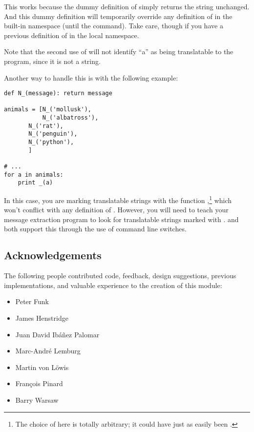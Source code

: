 This works because the dummy definition of \function{_()} simply returns
the string unchanged.  And this dummy definition will temporarily
override any definition of \function{_()} in the built-in namespace
(until the  command).
Take care, though if you have a previous definition of \function{_} in
the local namespace.

Note that the second use of \function{_()} will not identify ``a'' as
being translatable to the  program, since it is not
a string.

Another way to handle this is with the following example:

\begin{verbatim}
def N_(message): return message

animals = [N_('mollusk'),
           N_('albatross'),
	   N_('rat'),
	   N_('penguin'),
	   N_('python'),
	   ]

# ...
for a in animals:
    print _(a)
\end{verbatim}

In this case, you are marking translatable strings with the function
,\footnote{The choice of  here is totally
arbitrary; it could have just as easily been
.
} which won't conflict with any definition of
\function{_()}.  However, you will need to teach your message extraction
program to look for translatable strings marked with .
 and  both support this through the
use of command line switches.

\subsection{Acknowledgements}

The following people contributed code, feedback, design suggestions,
previous implementations, and valuable experience to the creation of
this module:

\begin{itemize}
    \item Peter Funk
    \item James Henstridge
    \item Juan David Ib\'a\~nez Palomar
    \item Marc-Andr\'e Lemburg
    \item Martin von L\"owis
    \item Fran\c cois Pinard
    \item Barry Warsaw
\end{itemize}
